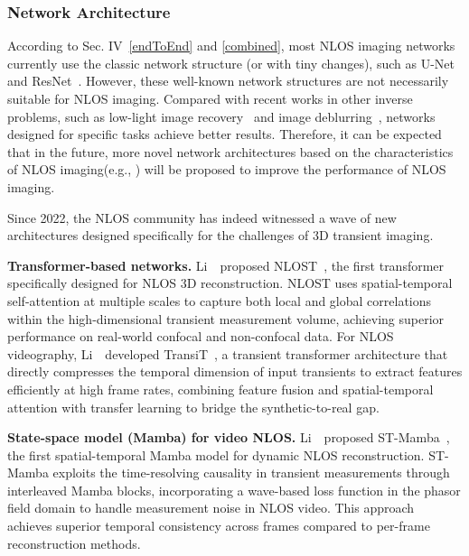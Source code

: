 \subsubsection{Network Architecture}
According to Sec. IV~\ref{endToEnd} and \ref{combined}, most NLOS imaging networks currently use the classic network structure (or with tiny changes), such as U-Net~\cite{ronnebergerUnetConvolutionalNetworks2015a} and ResNet~\cite{heDeepResidualLearning2016a}. However, these well-known network structures are not necessarily suitable for NLOS imaging. Compared with recent works in other inverse problems, such as low-light image recovery~\cite{liu_pd-gan_2021} and image deblurring~\cite{rozumnyi_defmo_2020}, networks designed for specific tasks achieve better results. Therefore, it can be expected that in the future, more novel network architectures based on the characteristics of NLOS imaging(e.g., \cite{chen_learned_2020}) will be proposed to improve the performance of NLOS imaging.

Since 2022, the NLOS community has indeed witnessed a wave of new architectures designed specifically for the challenges of 3D transient imaging.

\vspace{0.8mm}
\noindent \textbf{Transformer-based networks.}
Li~\etal~proposed NLOST~\cite{liNLOST2023}, the first transformer specifically designed for NLOS 3D reconstruction. NLOST uses spatial-temporal self-attention at multiple scales to capture both local and global correlations within the high-dimensional transient measurement volume, achieving superior performance on real-world confocal and non-confocal data. For NLOS videography, Li~\etal~developed TransiT~\cite{liTransiT2025}, a transient transformer architecture that directly compresses the temporal dimension of input transients to extract features efficiently at high frame rates, combining feature fusion and spatial-temporal attention with transfer learning to bridge the synthetic-to-real gap.

\vspace{0.8mm}
\noindent \textbf{State-space model (Mamba) for video NLOS.}
Li~\etal~proposed ST-Mamba~\cite{liMambaTemporalConsistency2024}, the first spatial-temporal Mamba model for dynamic NLOS reconstruction. ST-Mamba exploits the time-resolving causality in transient measurements through interleaved Mamba blocks, incorporating a wave-based loss function in the phasor field domain to handle measurement noise in NLOS video. This approach achieves superior temporal consistency across frames compared to per-frame reconstruction methods.

